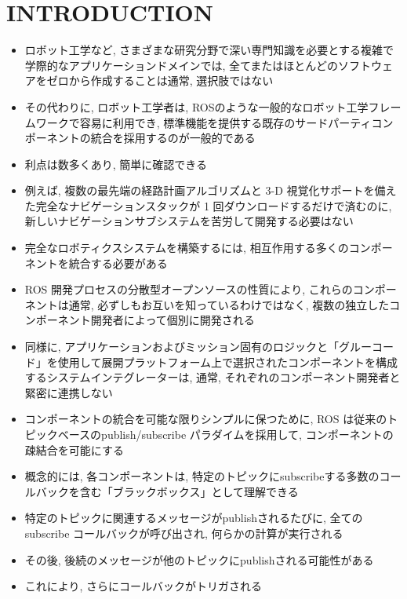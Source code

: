 
\section{INTRODUCTION}
\label{sec: introduction}

\begin{frame}{}
    \begin{itemize}
        \item ロボット工学など, さまざまな研究分野で深い専門知識を必要とする複雑で学際的なアプリケーションドメインでは, 全てまたはほとんどのソフトウェアをゼロから作成することは通常, 選択肢ではない
        \item その代わりに, ロボット工学者は, ROSのような一般的なロボット工学フレームワークで容易に利用でき, 標準機能を提供する既存のサードパーティコンポーネントの統合を採用するのが一般的である
        \item 利点は数多くあり, 簡単に確認できる
        \item 例えば, 複数の最先端の経路計画アルゴリズムと 3-D 視覚化サポートを備えた完全なナビゲーションスタックが 1 回ダウンロードするだけで済むのに, 新しいナビゲーションサブシステムを苦労して開発する必要はない
    \end{itemize}
\end{frame}

\begin{frame}{}
    \begin{itemize}
        \item 完全なロボティクスシステムを構築するには, 相互作用する多くのコンポーネントを統合する必要がある
        \item ROS 開発プロセスの分散型オープンソースの性質により, これらのコンポーネントは通常, 必ずしもお互いを知っているわけではなく, 複数の独立したコンポーネント開発者によって個別に開発される
        \item 同様に, アプリケーションおよびミッション固有のロジックと「グルーコード」を使用して展開プラットフォーム上で選択されたコンポーネントを構成するシステムインテグレーターは, 通常, それぞれのコンポーネント開発者と緊密に連携しない
    \end{itemize}
\end{frame}

\begin{frame}{}
    \begin{itemize}
        \item コンポーネントの統合を可能な限りシンプルに保つために, ROS は従来のトピックベースのpublish/subscribe パラダイムを採用して, コンポーネントの疎結合を可能にする
        \item 概念的には, 各コンポーネントは, 特定のトピックにsubscribeする多数のコールバックを含む「ブラックボックス」として理解できる
        \item 特定のトピックに関連するメッセージがpublishされるたびに, 全てのsubscribe コールバックが呼び出され, 何らかの計算が実行される
        \item その後, 後続のメッセージが他のトピックにpublishされる可能性がある
        \item これにより, さらにコールバックがトリガされる
    \end{itemize}
\end{frame}

